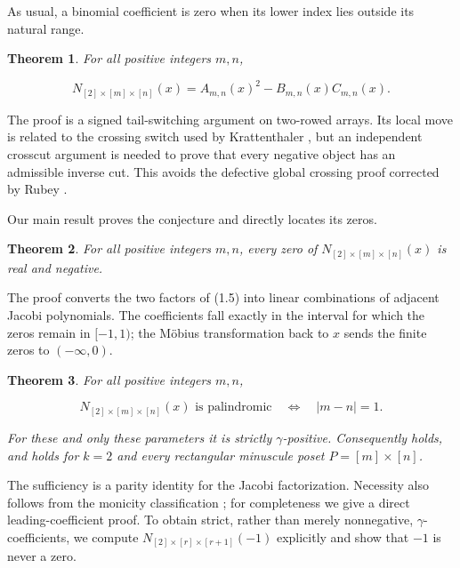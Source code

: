 \documentclass[11pt]{article}
\newtheorem{theorem}{Theorem}[section]
\numberwithin{equation}{section}
\begin{document}
As usual, a binomial coefficient is zero when its lower index lies outside its
natural range.

\Needspace{0.30\textheight}
\begin{theorem}

For all positive integers $m,n$,

\nopagebreak[4]
\[
N_{[2]\times[m]\times[n]}(x)
=A_{m,n}(x)^2-B_{m,n}(x)C_{m,n}(x).
\tag{1.5}
\]

\end{theorem}

The proof is a signed tail-switching argument on two-rowed arrays. Its local move
is related to the crossing switch used by Krattenthaler \cite{krattenthaler1995}, but an independent
crosscut argument is needed to prove that every negative object has an admissible
inverse cut. This avoids the defective global crossing proof corrected by Rubey \cite{rubey}.

Our main result proves the conjecture and directly locates its zeros.

\Needspace{0.30\textheight}
\begin{theorem}

For all positive integers $m,n$, every zero of
$N_{[2]\times[m]\times[n]}(x)$ is real and negative.

\end{theorem}

The proof converts the two factors of (1.5) into linear combinations of adjacent
Jacobi polynomials. The coefficients fall exactly in the interval for which the
zeros remain in $[-1,1)$; the Möbius transformation back to $x$ sends the finite
zeros to $(-\infty,0)$.

\Needspace{0.30\textheight}
\begin{theorem}

For all positive integers $m,n$,

\nopagebreak[4]
\[
N_{[2]\times[m]\times[n]}(x)
\text{ is palindromic}
\quad\Longleftrightarrow\quad
|m-n|=1.
\]

For these and only these parameters it is strictly $\gamma$-positive.
Consequently \cite[Conjecture~4.5]{ding2019} holds, and \cite[Conjecture~B]{ding2019} holds for
$k=2$ and every rectangular minuscule poset $P=[m]\times[n]$.

\end{theorem}

The sufficiency is a parity identity for the Jacobi factorization. Necessity
also follows from the monicity classification \cite[Lemma~2.3(a)]{ding2019}; for
completeness we give a direct leading-coefficient proof. To obtain strict,
rather than merely nonnegative, $\gamma$-coefficients, we compute
$N_{[2]\times[r]\times[r+1]}(-1)$ explicitly and show that $-1$ is never a
zero.
\end{document}
